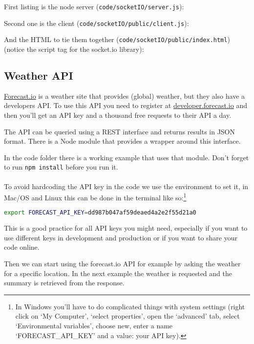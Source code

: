 \documentclass[a4paper]{report}
\begin{document}
First listing is the node server (\texttt{code/socketIO/server.js}):


\noindent Second one is the client (\texttt{code/socketIO/public/client.js}):


\noindent And the HTML to tie them together (\texttt{code/socketIO/public/index.html}) (notice the script tag for the socket.io library):


\subsection*{Weather API}
\href{http://forecast.io/}{Forecast.io} is a weather site that provides (global) weather, but they also have a developers API. To use this API you need to register at \href{https://developer.forecast.io/}{developer.forecast.io} and then you'll get an API key and a thousand free requests to their API a day.

The API can be queried using a REST interface and returns results in JSON format. There is a Node module that provides a wrapper around this interface.

In the code folder there is a working example that uses that module. Don't forget to run \colorbox{codecol}{\lstinline[language=bash]{npm install}} before you run it.
\\
\\
\noindent To avoid hardcoding the API key in the code we use the environment to set it, in Mac/OS and Linux this can be done in the terminal like so:\footnote{In Windows you'll have to do complicated things with system settings (right click on `My Computer', `select properties', open the `advanced' tab, select `Environmental variables', choose new, enter a name `FORECAST\_API\_KEY' and a value: your API key).}
\begin{lstlisting}[language=bash]
export FORECAST_API_KEY=dd987b047af59deaed4a2e2f55d21a0
\end{lstlisting}

\noindent This is a good practice for all API keys you might need, especially if you want to use different keys in development and production or if you want to share your code online.

\noindent Then we can start using the forecast.io API for example by asking the weather for a specific location. In the next example the weather is requested and the summary is retrieved from the response.
\end{document}
